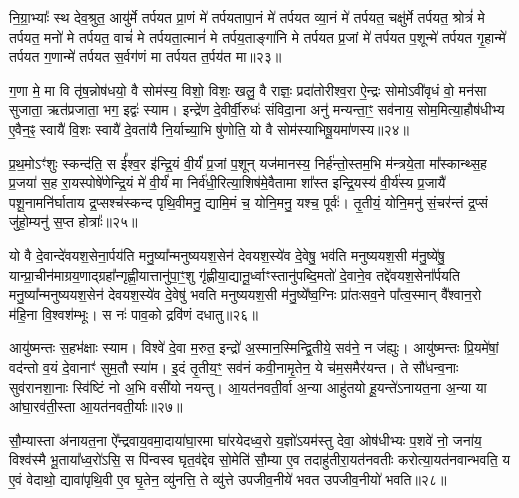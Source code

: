 {\anuvakamend[{प्रा॒णा॒पा॒नयो᳚र्भू॒तं वृ॑ङ्क्ते॒\-ऽष्टाविꣳ॑शतिश्च॥७॥}]}

नि॒ग्रा॒भ्याः᳚ स्थ देव॒श्रुत॒ आयु॑र्मे तर्पयत प्रा॒णं मे॑ तर्पयतापा॒नं मे॑ तर्पयत व्या॒नं मे॑ तर्पयत॒ चक्षु॑र्मे तर्पयत॒ श्रोत्रं॑ मे तर्पयत॒ मनो॑ मे तर्पयत॒ वाचं॑ मे तर्पयता॒त्मानं॑ मे तर्पय॒ताङ्गा॑नि मे तर्पयत प्र॒जां मे॑ तर्पयत प॒शून्मे॑ तर्पयत गृ॒हान्मे॑ तर्पयत ग॒णान्मे॑ तर्पयत स॒र्वग॑णं मा तर्पयत त॒र्पय॑त मा॥२३॥

ग॒णा मे॒ मा वि तृ॑ष॒न्नोष॑धयो॒ वै सोम॑स्य॒ विशो॒ विशः॒ खलु॒ वै राज्ञः॒ प्रदा॑तोरीश्व॒रा ऐ॒न्द्रः सोमो\-ऽवी॑वृधं वो॒ मन॑सा सुजाता॒ ऋत॑प्रजाता॒ भग॒ इद्वः॑ स्याम। इन्द्रे॑ण दे॒वीर्वी॒रुधः॑ संविदा॒ना अनु॑ मन्यन्ता॒ꣳ॒ सव॑नाय॒ सोम॒मित्या॒हौष॑धीभ्य ए॒वैन॒ꣴ॒ स्वायै॑ वि॒शः स्वायै॑ दे॒वता॑यै नि॒र्याच्या॒भि षु॑णोति॒ यो वै सोम॑स्याभिषू॒यमा॑णस्य॥२४॥

प्र॒थ॒मो\-ऽꣳ॑शुः स्कन्द॑ति॒ स ई᳚श्व॒र इ॑न्द्रि॒यं वी॒र्यं॑ प्र॒जां प॒शून् यज॑मानस्य॒ निर्\mbox{}ह॑न्तो॒स्तम॒भि म॑न्त्रये॒ता मा᳚स्कान्थ्स॒ह प्र॒जया॑ स॒ह रा॒यस्पोषे॑णेन्द्रि॒यं मे॑ वी॒र्यं॑ मा निर्व॑धी॒रित्या॒शिष॑मे॒वैतामा शा᳚स्त इन्द्रि॒यस्य॑ वी॒र्य॑स्य प्र॒जायै॑ पशू॒नामनि॑र्घाताय द्र॒प्सश्च॑स्कन्द पृथि॒वीमनु॒ द्यामि॒मं च॒ योनि॒मनु॒ यश्च॒ पूर्वः॑। तृ॒तीयं॒ योनि॒मनु॑ सं॒चर॑न्तं द्र॒प्सं जु॑हो॒म्यनु॑ स॒प्त होत्राः᳚॥२५॥

{\anuvakamend[{त॒र्पय॑त मा\-ऽभिषू॒यमा॑णस्य॒ यश्च॒ दश॑ च॥८॥}]}

यो वै दे॒वान्दे॑वयश॒सेना॒र्पय॑ति मनु॒ष्या᳚न्मनुष्ययश॒सेन॑ देवयश॒स्ये॑व दे॒वेषु॒ भव॑ति मनुष्ययश॒सी म॑नु॒ष्ये॑षु॒ यान्प्रा॒चीन॑माग्रय॒णाद्ग्रहा᳚न्गृह्णी॒यात्तानु॑पा॒ꣳ॒शु गृ॑ह्णीया॒द्यानू॒र्ध्वाꣳस्तानु॑पब्दि॒मतो॑ दे॒वाने॒व तद्दे॑वयश॒सेना᳚र्पयति मनु॒ष्या᳚न्मनुष्ययश॒सेन॑ देवयश॒स्ये॑व दे॒वेषु॑ भवति मनुष्ययश॒सी म॑नु॒ष्ये᳚ष्व॒ग्निः प्रा॑तःसव॒ने पा᳚त्व॒स्मान् वै᳚श्वान॒रो म॑हि॒ना वि॒श्वश॑म्भूः। स नः॑ पाव॒को द्रवि॑णं दधातु॥२६॥

आयु॑ष्मन्तः स॒हभ॑क्षाः स्याम। विश्वे॑ दे॒वा म॒रुत॒ इन्द्रो॑ अ॒स्मान॒स्मिन्द्वि॒तीये॒ सव॑ने॒ न ज॑ह्युः। आयु॑ष्मन्तः प्रि॒यमे॑षां॒ वद॑न्तो व॒यं दे॒वानाꣳ॑ सुम॒तौ स्या॑म। इ॒दं तृ॒तीय॒ꣳ॒ सव॑नं कवी॒नामृ॒तेन॒ ये च॑म॒समैर॑यन्त। ते सौ॑धन्व॒नाः सुव॑रानशा॒नाः स्वि॑ष्टिं नो अ॒भि वसी॑यो नयन्तु। आ॒यत॑नवती॒र्वा अ॒न्या आहु॑तयो हू॒यन्ते॑\-ऽनायत॒ना अ॒न्या या आ॑घा॒रव॑ती॒स्ता आ॒यत॑नवती॒र्याः॥२७॥

सौ॒म्यास्ता अ॑नायत॒ना ऐ᳚न्द्रवाय॒वमा॒दाया॑घा॒रमा घा॑रयेदध्व॒रो य॒ज्ञो॑\-ऽयम॑स्तु देवा॒ ओष॑धीभ्यः प॒शवे॑ नो॒ जना॑य॒ विश्व॑स्मै भू॒ताया᳚ध्व॒रो॑\-ऽसि॒ स पि॑न्वस्व घृत॒व॑द्देव सो॒मेति॑ सौ॒म्या ए॒व तदाहु॑तीरा॒यत॑नवतीः करोत्या॒यत॑नवान्भवति॒ य ए॒वं वेदाथो॒ द्यावा॑पृथि॒वी ए॒व घृ॒तेन॒ व्यु॑नत्ति॒ ते व्यु॑त्ते उपजीव॒नीये॑ भवत उपजीव॒नीयो॑ भवति॥२८॥

